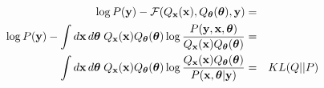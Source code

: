 {\begin{frame}
\begin{eqnarray*}
\log P(\bfy) - {\cal F}(Q_\bfx(\bfx),Q_{\btheta}(\btheta),\bfy) &=& \\
\log P(\bfy) - \int d\bfx \, d\btheta \; Q_\bfx(\bfx) 
Q_{\btheta}(\btheta)  \log \frac{P(\bfy,\bfx,\btheta)}{ Q_\bfx(\bfx) 
Q_{\btheta}(\btheta)  } &=&  \\ 
\int d\bfx \, d\btheta \; Q_\bfx(\bfx) 
Q_{\btheta}(\btheta)  \log \frac{ Q_\bfx(\bfx) 
Q_{\btheta}(\btheta)  }{P(\bfx,\btheta|\bfy)} &=&  KL(Q||P) 
\end{eqnarray*}
\end{frame}
}

